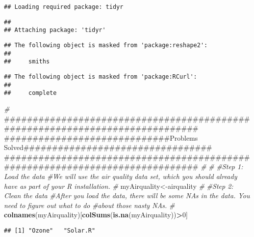\documentclass[]{article}
\newenvironment{Shaded}{\begin{snugshade}}{\end{snugshade}}
\newcommand{\KeywordTok}[1]{\textcolor[rgb]{0.13,0.29,0.53}{\textbf{#1}}}
\newcommand{\DecValTok}[1]{\textcolor[rgb]{0.00,0.00,0.81}{#1}}
\newcommand{\CommentTok}[1]{\textcolor[rgb]{0.56,0.35,0.01}{\textit{#1}}}
\newcommand{\OperatorTok}[1]{\textcolor[rgb]{0.81,0.36,0.00}{\textbf{#1}}}
\newcommand{\NormalTok}[1]{#1}
\begin{document}
\begin{verbatim}
## Loading required package: tidyr
\end{verbatim}

\begin{verbatim}
## 
## Attaching package: 'tidyr'
\end{verbatim}

\begin{verbatim}
## The following object is masked from 'package:reshape2':
## 
##     smiths
\end{verbatim}

\begin{verbatim}
## The following object is masked from 'package:RCurl':
## 
##     complete
\end{verbatim}

\begin{Shaded}
\begin{Highlighting}[]
\CommentTok{#}
\NormalTok{#############################################################################}
\NormalTok{#############################Problems Solved#################################}
\NormalTok{#############################################################################}
\CommentTok{#}
\CommentTok{#}
\CommentTok{#Step 1: Load the data }
\CommentTok{#We will use the air quality data set, which you should already have as part of your R installation.}
\CommentTok{#}
\NormalTok{myAirquality<-airquality}
\CommentTok{#}
\CommentTok{#Step 2: Clean the data}
\CommentTok{#After you load the data, there will be some NAs in the data. You need to figure out what to do}
\CommentTok{#about those nasty NAs.}
\CommentTok{#}
\KeywordTok{colnames}\NormalTok{(myAirquality)[}\KeywordTok{colSums}\NormalTok{(}\KeywordTok{is.na}\NormalTok{(myAirquality))}\OperatorTok{>}\DecValTok{0}\NormalTok{]}
\end{Highlighting}
\end{Shaded}

\begin{verbatim}
## [1] "Ozone"   "Solar.R"
\end{verbatim}
\end{document}
